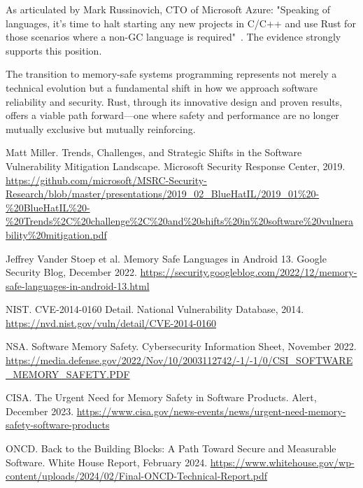 \documentclass[11pt]{article}
\begin{document}
As articulated by Mark Russinovich, CTO of Microsoft Azure: "Speaking of languages, it's time to halt starting any new projects in C/C++ and use Rust for those scenarios where a non-GC language is required"~\cite{russinovich2022}. The evidence strongly supports this position.

The transition to memory-safe systems programming represents not merely a technical evolution but a fundamental shift in how we approach software reliability and security. Rust, through its innovative design and proven results, offers a viable path forward—one where safety and performance are no longer mutually exclusive but mutually reinforcing.


\begin{thebibliography}{99}

Matt Miller.
\newblock Trends, Challenges, and Strategic Shifts in the Software Vulnerability Mitigation Landscape.
\newblock Microsoft Security Response Center, 2019.
\newblock \url{https://github.com/microsoft/MSRC-Security-Research/blob/master/presentations/2019_02_BlueHatIL/2019_01\%20-\%20BlueHatIL\%20-\%20Trends\%2C\%20challenge\%2C\%20and\%20shifts\%20in\%20software\%20vulnerability\%20mitigation.pdf}

Jeffrey Vander Stoep et al.
\newblock Memory Safe Languages in Android 13.
\newblock Google Security Blog, December 2022.
\newblock \url{https://security.googleblog.com/2022/12/memory-safe-languages-in-android-13.html}

NIST.
\newblock CVE-2014-0160 Detail.
\newblock National Vulnerability Database, 2014.
\newblock \url{https://nvd.nist.gov/vuln/detail/CVE-2014-0160}

NSA.
\newblock Software Memory Safety.
\newblock Cybersecurity Information Sheet, November 2022.
\newblock \url{https://media.defense.gov/2022/Nov/10/2003112742/-1/-1/0/CSI_SOFTWARE_MEMORY_SAFETY.PDF}

CISA.
\newblock The Urgent Need for Memory Safety in Software Products.
\newblock Alert, December 2023.
\newblock \url{https://www.cisa.gov/news-events/news/urgent-need-memory-safety-software-products}

ONCD.
\newblock Back to the Building Blocks: A Path Toward Secure and Measurable Software.
\newblock White House Report, February 2024.
\newblock \url{https://www.whitehouse.gov/wp-content/uploads/2024/02/Final-ONCD-Technical-Report.pdf}


\end{thebibliography}
\end{document}
